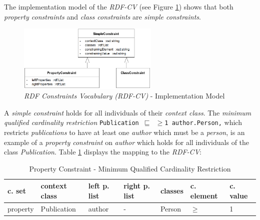 \documentclass[a4paper,fontsize=11pt]{scrartcl}
\newcommand{\ms}[1]{\texttt{#1}}
\begin{document}
The implementation model of the \emph{RDF-CV} (see Figure \ref{fig:RDF-CV-implementation-model}) shows that
both \emph{property constraints} and \emph{class constraints} are \emph{simple constraints}. 
\begin{figure}
	\centering
		\includegraphics[width=0.60\textwidth]{images/RDF-CV-implementation-model.png}
	\caption{\emph{RDF Constraints Vocabulary (RDF-CV)} - Implementation Model}
	\label{fig:RDF-CV-implementation-model}
\end{figure}
A \emph{simple constraint} holds for all individuals of their \emph{context class}.
The \emph{minimum qualified cardinality restriction} {\small\ms{Publication $\sqsubseteq$ $\geq$1 author.Person,}}
which restricts \emph{publications} to have at least one \emph{author} which must be a \emph{person},
is an example of a \emph{property constraint} on \emph{author}
which holds for all individuals of the class \emph{Publication}.
Table \ref{tab:property-constraint-cardinality-restriction} displays the mapping to the \emph{RDF-CV}:
\begin{table}[H]
  \scriptsize
  \sffamily
  \vspace{0cm}
	\caption{Property Constraint - Minimum Qualified Cardinality Restriction}
	\label{tab:property-constraint-cardinality-restriction}
	\centering
		\begin{tabular}{l|l|l|l|l|l|l}
      \textbf{c. set} & \textbf{context class} & \textbf{left p. list} & \textbf{right p. list} & \textbf{classes} & \textbf{c. element} & \textbf{c. value} \\
      \hline
      property & Publication & author & - & Person & $\geq$ & 1 \\
		\end{tabular}
\end{table}
\end{document}
